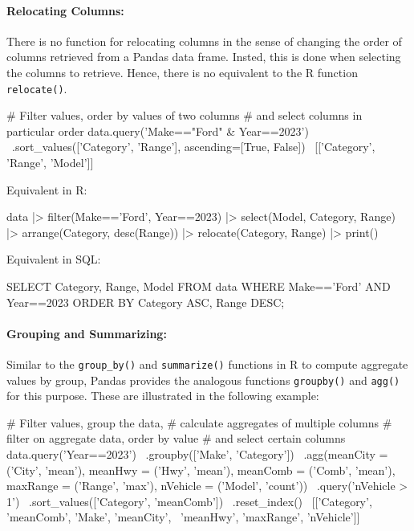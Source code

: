 \paragraph*{Relocating Columns:} There is no function for relocating columns in the sense of changing the order of columns retrieved from a Pandas data frame. Insted, this is done when selecting the columns to retrieve. Hence, there is no equivalent to the R function \texttt{relocate()}.

\begin{samepage}
\begin{pythoncode}
# Filter values, order by values of two columns
# and select columns in particular order
data.query('Make=="Ford" & Year==2023') \
    .sort_values(['Category', 'Range'], ascending=[True, False]) \
    [['Category', 'Range', 'Model']]
\end{pythoncode}
\end{samepage}

\begin{multicols}{2}

Equivalent in R:

\begin{Rcode}
data |> 
  filter(Make=='Ford', 
         Year==2023) |> 
  select(Model, Category, 
         Range) |>
  arrange(Category, 
          desc(Range)) |>
  relocate(Category, Range) |>
  print()
\end{Rcode}

Equivalent in SQL:

\begin{sqlcode}
SELECT Category, Range, Model
   FROM data 
   WHERE Make=='Ford' AND 
         Year==2023
   ORDER BY Category ASC, 
            Range DESC;
\end{sqlcode}
\end{multicols}

\paragraph*{Grouping and Summarizing:} Similar to the \texttt{group\_by()} and \texttt{summarize()} functions in R to compute aggregate values by group, Pandas provides the analogous functions \texttt{groupby()} and \texttt{agg()} for this purpose. These are illustrated in the following example:

\begin{samepage}
\begin{pythoncode}
# Filter values, group the data,
# calculate aggregates of multiple columns
# filter on aggregate data, order by value
# and select certain columns
data.query('Year==2023') \
    .groupby(['Make', 'Category']) \
    .agg(meanCity = ('City', 'mean'),
         meanHwy = ('Hwy', 'mean'),
         meanComb = ('Comb', 'mean'),
         maxRange = ('Range', 'max'),
         nVehicle = ('Model', 'count')) \
    .query('nVehicle > 1') \
    .sort_values(['Category', 'meanComb']) \
    .reset_index() \
    [['Category', 'meanComb', 'Make', 'meanCity', \
      'meanHwy', 'maxRange', 'nVehicle']]
\end{pythoncode}
\end{samepage}

